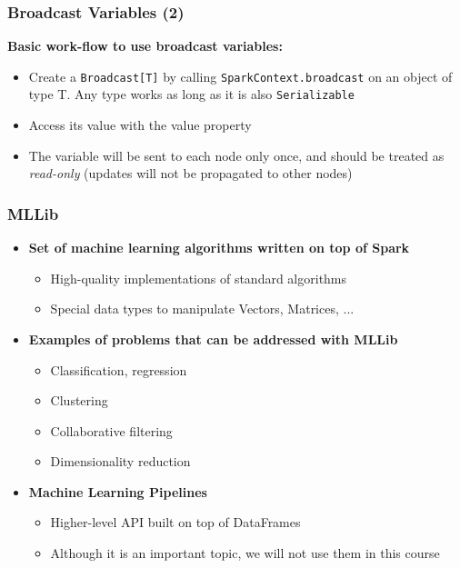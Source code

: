 \begin{frame}\frametitle{Broadcast Variables (2)}
{\bf Basic work-flow to use broadcast variables:}

\vspace{20pt}

\begin{itemize}
	\item Create a \texttt{Broadcast[T]} by calling \texttt{SparkContext.broadcast} on an object of type T. Any type works as long as it is also \texttt{Serializable}
	\item Access its value with the value property
	\item The variable will be sent to each node only once, and should be treated as \emph{read-only} (updates will not be propagated to other nodes)
\end{itemize}
\end{frame}

\begin{frame}\frametitle{MLLib}
\begin{itemize}
	\item {\bf Set of machine learning algorithms written on top of Spark}
	\begin{itemize}
		\item High-quality implementations of standard algorithms
		\item Special data types to manipulate Vectors, Matrices, ...
	\end{itemize}

	\item {\bf Examples of problems that can be addressed with MLLib}
	\begin{itemize}
		\item Classification, regression
		\item Clustering
		\item Collaborative filtering
		\item Dimensionality reduction
	\end{itemize}

	\item {\bf Machine Learning Pipelines}
	\begin{itemize}
		\item Higher-level API built on top of DataFrames
		\item Although it is an important topic, we will not use them in this course
	\end{itemize}
\end{itemize}
\end{frame}